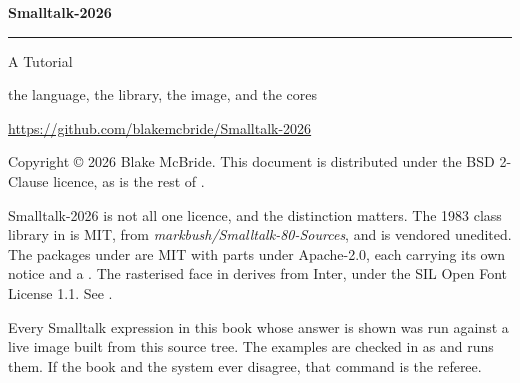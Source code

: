 \thispagestyle{empty}
\begin{center}
\vspace*{1.1in}
{\sffamily\fontsize{40}{44}\selectfont\bfseries\color{stblue} Smalltalk-2026}

\vspace{10pt}
{\color{strule}\rule{0.62\textwidth}{1pt}}

\vspace{14pt}
{\sffamily\Large\color{stink} A Tutorial}

\vspace{6pt}
{\sffamily\normalsize\color{stgrey} the language, the library, the image, and the cores}

\vfill

{\small\color{stgrey}
\url{https://github.com/blakemcbride/Smalltalk-2026}
}

\vspace{18pt}
\end{center}

\clearpage
\thispagestyle{empty}
\vspace*{\fill}
\noindent
\begin{minipage}{\textwidth}
\small\color{stgrey}
\noindent
Copyright \copyright{} 2026 Blake McBride. This document is distributed under
the BSD 2-Clause licence, as is the rest of .

\vspace{8pt}\noindent
Smalltalk-2026 is not all one licence, and the distinction matters. The 1983
class library in  is MIT, from \emph{markbush/Smalltalk-80-Sources},
and is vendored unedited. The packages under  are MIT with parts
under Apache-2.0, each carrying its own notice and a . The
rasterised face in  derives from Inter, under the SIL
Open Font License 1.1. See .

\vspace{8pt}\noindent
Every Smalltalk expression in this book whose answer is shown was run against
a live image built from this source tree. The examples are checked in as
 and  runs
them. If the book and the system ever disagree, that command is the referee.
\end{minipage}
\vspace*{\fill}
